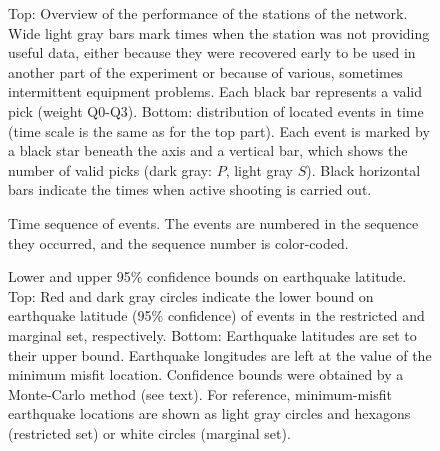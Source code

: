 \documentclass[aguplus]{aguplus}
\renewcommand{\includefig}[2]{}
\newlength{\tw}
\begin{document}

\clearpage

\begin{table}
\label{tbl:stations}
\end{table}


\clearpage


\begin{figure}

\includefig{timeline/timeline}{0.8\tw} %

\caption{Top: Overview of the performance of the stations of the network.
Wide light gray bars mark times when the station was not providing
useful data, either because they were recovered early to be used in
another part of the experiment or because of various, sometimes
intermittent equipment problems.  Each black bar represents a valid
pick (weight Q0-Q3).  Bottom: distribution of located events in time
(time scale is the same as for the top part).  Each event is marked by
a black star beneath the axis and a
vertical bar, which shows the number of valid picks (dark gray: $P$, light
gray $S$).  Black horizontal bars indicate the times when active
shooting is carried out.}
\label{fig:timeline}
\end{figure}

\begin{figure}

\includefig{time-map/time-map}{0.8\tw} %

\caption{Time sequence of events.  The events are numbered in the
sequence they occurred, and the sequence number is color-coded.}
\label{fig:time-map}
\end{figure}


\begin{figure}

\includefig{seismag-map-95/seismag-map-95-0}{0.65\tw} %

\includefig{seismag-map-95/seismag-map-95-1}{0.65\tw} %

\caption{Lower and upper 95\% confidence bounds on earthquake
latitude.   Top: Red and dark gray circles
indicate the lower bound on earthquake latitude (95\% confidence) of
events in the restricted and marginal set, respectively.
Bottom: Earthquake latitudes are set to their upper bound.
Earthquake longitudes are left at the value of the minimum misfit
location.  Confidence bounds were obtained by a Monte-Carlo method
(see text). For reference, minimum-misfit earthquake locations are shown as
 light gray circles and hexagons  (restricted set) or white circles
(marginal set). }
\label{fig:map95lat}
\end{figure}
\end{document}
